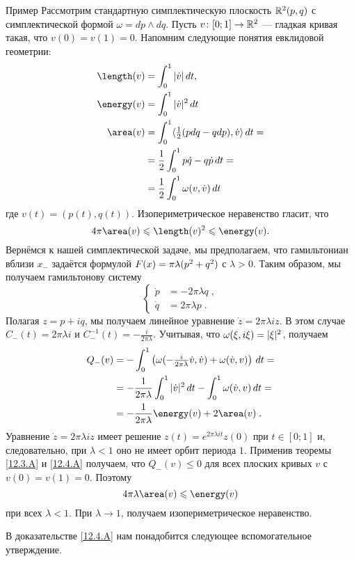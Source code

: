\begin{ex*}{Пример}
Рассмотрим стандартную симплектическую плоскость $\mathbb{R}^2(p, q)$ с
симплектической формой $\omega = dp \wedge dq$. 
Пусть $v\colon [0;1] \to\mathbb{R}^2$ — гладкая кривая такая, что $v(0)=v(1)=0$.
Напомним следующие понятия евклидовой геометрии: 
\begin{align*}
\length(v)&=\int_0^1|\dot v|\,\d t,
\\
\energy(v)&=\int_0^1|\dot v|^2\,\d t
\\
\area(v)&=\int_0^1\langle \tfrac12(p\d q-q\d p),\dot v\rangle\,\d t=
\\
&=\frac12\int_0^1 p\dot q-q\dot p\,\d t=
\\
&=\frac12\int_0^1\omega(v,\dot v)\,\d t
\end{align*}
где $v(t) = (p(t), q(t))$.
Изопериметрическое неравенство гласит, что
\[4\pi\area(v)\le\length(v)^2\le \energy(v).\]
Вернёмся к нашей симплектической задаче, мы предполагаем, что
гамильтониан вблизи $x_-$ задаётся формулой $F(x) = \pi \lambda(p^2
\z+ q^2)$ с $\lambda > 0$. 
Таким образом, мы получаем гамильтонову систему 
\[
\begin{cases}
\dot p &= -2\pi\lambda q\;,
\\
\dot q &= 2\pi\lambda p\;.
\end{cases}
\]
Полагая $z = p + iq$, мы получаем линейное уравнение $\dot z = 2\pi
\lambda iz$. 
В этом случае $C_-(t) = 2\pi\lambda i$ и $C_-^{-1}(t) = -\frac i{2\pi\lambda}$.
Учитывая, что $\omega(\xi,i\xi) \z= |\xi|^2$, получаем
\begin{align*}
Q_-(v)&=-\int_0^1\left(\omega(-\tfrac i{2\pi\lambda}\dot v,\dot
v)+\omega(\dot v, v)\right)\,dt= 
\\
&=-\frac 1{2\pi\lambda}\int_0^1|\dot v|^2\,dt-\int_0^1\omega(\dot v,v)\,dt=
\\
&=-\frac 1{2\pi\lambda}\energy(v)+2\area(v)\;.
\end{align*}
Уравнение $\dot z = 2\pi\lambda iz$ имеет решение $z(t) = e^{2\pi\lambda it}z(0)$ при $t \in [0;1]$ и, следовательно, при $\lambda < 1$ оно не имеет орбит периода $1$.
Применив теоремы \ref{12.3.A} и \ref{12.4.A} получаем, что $Q_-(v)\le 0$ для всех плоских кривых $v$ с $v(0) = v(1) = 0$.
Поэтому 
\[4\pi \lambda \area(v) \le \energy (v)\]
при всех $\lambda < 1$.
При $\lambda\to1$, получаем изопериметрическое неравенство.
\end{ex*}

В доказательстве \ref{12.4.A} нам понадобится следующее вспомогательное утверждение.

